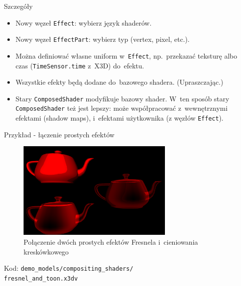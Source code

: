 \documentclass{beamer}
\begin{document}
\begin{frame}{Szczegóły}
\begin{itemize}
  \item Nowy węzeł \texttt{Effect}: wybierz język shaderów.
  \item Nowy węzeł \texttt{EffectPart}: wybierz typ (vertex, pixel, etc.).
  \item Można definiować własne uniform w~\texttt{Effect}, np.~przekazać
    teksturę albo czas (\texttt{TimeSensor.time} z~X3D) do~efektu.
  \item Wszystkie efekty będą dodane do~bazowego shadera. (Upraszczając.)
  \item Stary \texttt{ComposedShader} modyfikuje bazowy shader.
    W~ten sposób stary \texttt{ComposedShader} też jest lepszy:
    może współpracować z~wewnętrznymi efektami (shadow maps),
    i~efektami użytkownika (z węzłów \texttt{Effect}).
\end{itemize}
\end{frame}

\begin{frame}{Przykład - łączenie prostych efektów}
\begin{figure}
  \centering
  \includegraphics[width=3.0in]{../fresnel_and_toon}
  \caption{Połączenie dwóch prostych efektów Fresnela i~cieniowania kreskówkowego}
\end{figure}

Kod: \texttt{demo\_models/compositing\_shaders/\\fresnel\_and\_toon.x3dv}

\end{frame}
\end{document}
